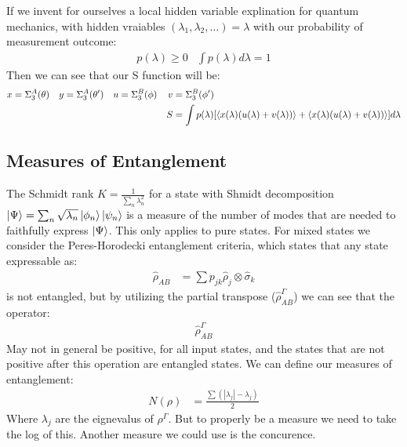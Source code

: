 If we invent for ourselves a local hidden variable explination for quantum mechanics, with hidden vraiables $(\lambda_1,\lambda_2,\ldots) = \lambda$ with our probability of measurement outcome:
\begin{align*}
	p(\lambda) \geq 0 & \int p(\lambda) d\lambda = 1
\end{align*}
Then we can see that our S function will be:
\begin{align*}
	x &= \Sigma^A_3(\theta) & y &= \Sigma^A_3(\theta') & u &= \Sigma^B_3(\phi) & v &= \Sigma^B_3(\phi') \\
	&&&&&&S &= \int p(\lambda) [\expval{x(\lambda)(u(\lambda) + v(\lambda))} + \expval{x(\lambda)(u(\lambda) + v(\lambda))}] d\lambda
\end{align*}
\subsection{Measures of Entanglement}
The Schmidt rank $K = \frac{1}{\sum_n \lambda_n^2}$ for a state with Shmidt decomposition $\ket{\Psi} = \sum_n \sqrt{\lambda_n}\ket{\phi_n}\ket{\psi_n}$ is a measure of the number of modes that are needed to faithfully express $\ket{\Psi}$.
This only applies to pure states. For mixed states we consider the Peres-Horodecki entanglement criteria, which states that any state expressable as:
\begin{align*}
	\hat{\rho}_{AB} &= \sum p_{jk} \hat{\rho}_j \otimes \hat{\sigma}_k
\end{align*}
is not entangled, but by utilizing the partial transpose ($\hat{\rho}_{AB}^\Gamma$) we can see that the operator:
\begin{align*}
	\hat{\rho}_{AB}^\Gamma
\end{align*}
May not in general be positive, for all input states, and the states that are not positive after this operation are entangled states. We can define our measures of entanglement:
\begin{align*}
	N(\rho) &= \frac{\sum (|\lambda_j| - \lambda_j)}{2}
\end{align*}
Where $\lambda_j$ are the eignevalus of $\rho^\Gamma$. But to properly be a measure we need to take the log of this. Another measure we could use is the concurence.
